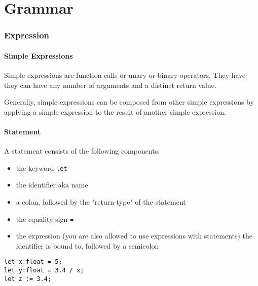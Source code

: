 \documentclass{scrartcl}
\begin{document}



\part{Grammar}

\section{Expression}

\subsection{Simple Expressions}

Simple expressions are function calls or unary or binary operators. They have they can have any number of arguments and a distinct return value.

\medskip

Generally, simple expressions can be composed from other simple expressions by applying a simple expression to the result of another simple expression.

\subsection{Statement}

A statement consists of the following components:

\begin{itemize}
    \item the keyword \texttt{let}
    \item the identifier aka name
    \item a colon, followed by the "return type" of the statement
    \item the equality sign \texttt{=}
    \item the expression (you are also allowed to use expressions with statements) the identifier is bound to, followed by a semicolon
\end{itemize}

\begin{lstlisting}
let x:float = 5;
let y:float = 3.4 / x;
let z := 3.4;
\end{lstlisting}
\end{document}
